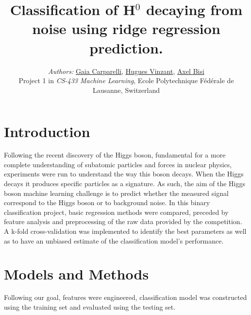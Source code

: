 \documentclass[10pt,conference,compsocconf]{IEEEtran}
\begin{document}
\title{Classification of H$^0$ decaying from noise using ridge regression prediction. }

\author{
 \textit{Authors:} \href{mailto:gaia.carparelli@epfl.ch}{Gaia Carparelli}, \href{mailto:hugues.vinzant@epfl.ch}{Hugues Vinzant}, \href{mailto:axel.bisi@epfl.ch}{Axel Bisi}  \\
 Project 1 in \textit{CS-433 Machine Learning}, Ecole Polytechnique F\'{e}d\'{e}rale de Lausanne, Switzerland
}

\maketitle

\begin{abstract}

\end{abstract}

\section{Introduction}

Following the recent discovery of the Higgs boson, fundamental for a more complete understanding of subatomic particles and forces in nuclear physics, experiments were run to understand the way this boson decays. When the Higgs decays it produces specific particles as a signature. As such, the aim of the Higgs boson machine learning challenge is to predict whether the measured signal correspond to the Higgs boson or to background noise. In this binary classification project, basic regression methods were compared, preceded by feature analysis and preprocessing of the raw data provided by the competition. A k-fold cross-validation was implemented to identify the best parameters as well as to have an unbiased estimate of the classification model's performance.

\section{Models and Methods}
\label{sec:methods}
Following our goal, features were engineered, classification model was constructed using the training set and evaluated using the testing set.
\end{document}
